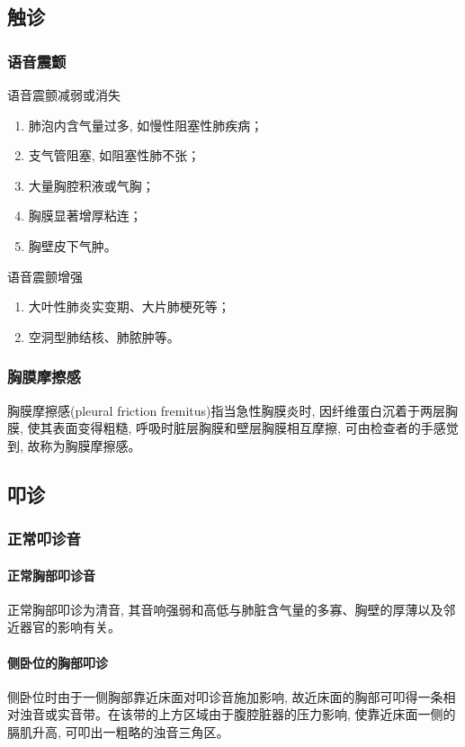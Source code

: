 \documentclass[UTF8]{ctexbook}
\begin{document}
\subsection{触诊}
\subsubsection{语音震颤}

语音震颤减弱或消失
\begin{enumerate}
    \item 肺泡内含气量过多, 如慢性阻塞性肺疾病；
    \item 支气管阻塞, 如阻塞性肺不张；
    \item 大量胸腔积液或气胸；
    \item 胸膜显著增厚粘连；
    \item 胸壁皮下气肿。
\end{enumerate}

语音震颤增强
\begin{enumerate}
    \item 大叶性肺炎实变期、大片肺梗死等；
    \item 空洞型肺结核、肺脓肿等。
\end{enumerate}

\subsubsection{胸膜摩擦感}
胸膜摩擦感(pleural friction fremitus)指当急性胸膜炎时, 因纤维蛋白沉着于两层胸膜, 使其表面变得粗糙, 呼吸时脏层胸膜和壁层胸膜相互摩擦, 可由检查者的手感觉到, 故称为胸膜摩擦感。

\subsection{叩诊}
\subsubsection{正常叩诊音}
\paragraph{正常胸部叩诊音}正常胸部叩诊为清音, 其音响强弱和高低与肺脏含气量的多寡、胸壁的厚薄以及邻近器官的影响有关。
\paragraph{侧卧位的胸部叩诊}
侧卧位时由于一侧胸部靠近床面对叩诊音施加影响, 故近床面的胸部可叩得一条相对浊音或实音带。在该带的上方区域由于腹腔脏器的压力影响, 使靠近床面一侧的膈肌升高, 可叩出一粗略的浊音三角区。
\end{document}
